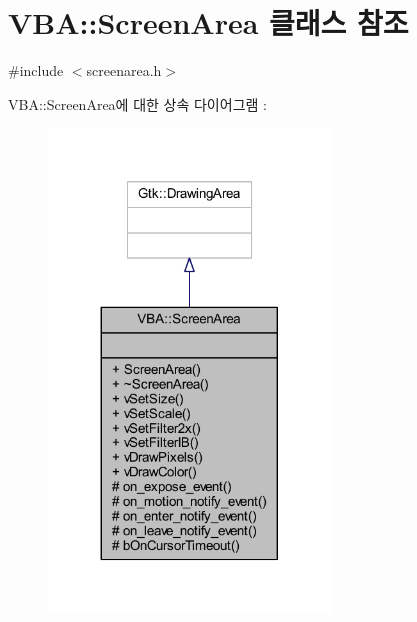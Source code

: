 \hypertarget{class_v_b_a_1_1_screen_area}{}\section{V\+BA\+:\+:Screen\+Area 클래스 참조}
\label{class_v_b_a_1_1_screen_area}


{\ttfamily \#include $<$screenarea.\+h$>$}



V\+BA\+:\+:Screen\+Area에 대한 상속 다이어그램 \+: \nopagebreak
\begin{figure}[H]
\begin{center}
\leavevmode
\includegraphics[width=212pt]{class_v_b_a_1_1_screen_area__inherit__graph}
\end{center}
\end{figure}


